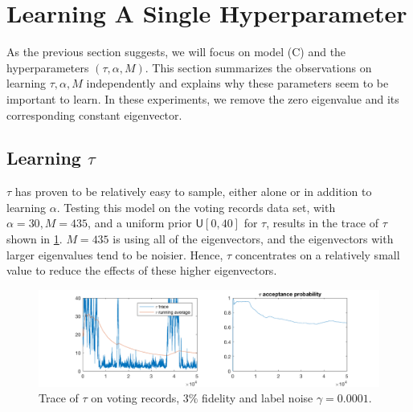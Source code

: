 \documentclass{siamart1116}
\begin{document}
\section{Learning A Single Hyperparameter}
    As the previous section suggests, we will focus on model (C) and the hyperparameters $(\tau,\alpha, M)$. This section summarizes the observations on learning $\tau, \alpha, M$ independently and explains why these parameters seem to be important to learn. In these experiments, we remove the zero eigenvalue and its corresponding constant eigenvector.




    \subsection{Learning $\tau$}
        $\tau$ has proven to be relatively easy to sample, either alone or in addition to learning $\alpha$. Testing this model on the voting records data set, with $\alpha = 30, M=435$, and a uniform prior $\mathsf{U}[0, 40]$ for $\tau$, results in the trace of $\tau$ shown in \cref{taM_tau_voting}. $M=435$ is using all of the eigenvectors, and the eigenvectors with larger eigenvalues tend to be noisier. Hence, $\tau$ concentrates on a relatively small value to reduce the effects of these higher eigenvectors.

        \begin{figure}[!htb]
        \centering
        \caption{\label{taM_tau_voting}Trace of $\tau$ on voting records, $3\%$ fidelity and label noise $\gamma = 0.0001$.}
        \includegraphics[width=0.8\linewidth]{tau_observations/voting.png}
        \end{figure}
\end{document}
